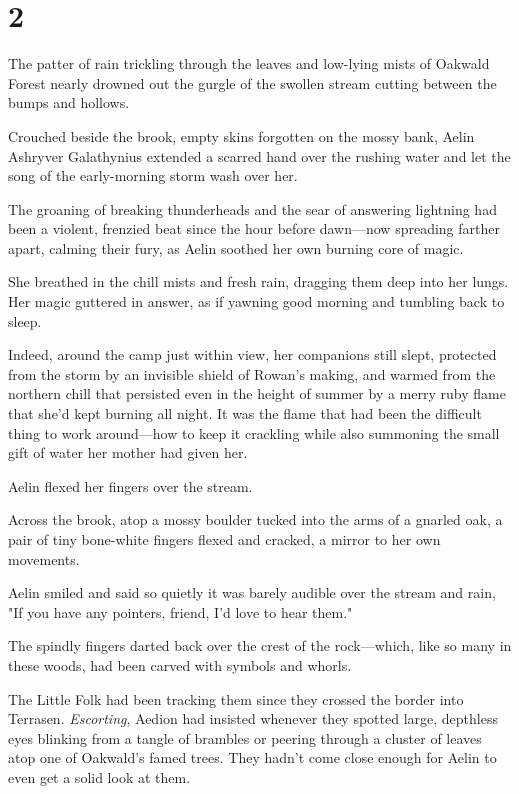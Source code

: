 
\chapter{2}

The patter of rain trickling through the leaves and low-lying mists of Oakwald Forest nearly drowned out the gurgle of the swollen stream cutting between the bumps and hollows.

Crouched beside the brook, empty skins forgotten on the mossy bank, Aelin Ashryver Galathynius extended a scarred hand over the rushing water and let the song of the early-morning storm wash over her.

The groaning of breaking thunderheads and the sear of answering lightning had been a violent, frenzied beat since the hour before dawn---now spreading farther apart, calming their fury, as Aelin soothed her own burning core of magic.

She breathed in the chill mists and fresh rain, dragging them deep into her lungs.
Her magic guttered in answer, as if yawning good morning and tumbling back to sleep.

Indeed, around the camp just within view, her companions still slept, protected from the storm by an invisible shield of Rowan's making, and warmed from the northern chill that persisted even in the height of summer by a merry ruby flame that she'd kept burning all night.
It was the flame that had been the difficult thing to work around---how to keep it crackling while also summoning the small gift of water her mother had given her.

Aelin flexed her fingers over the stream.

Across the brook, atop a mossy boulder tucked into the arms of a gnarled oak, a pair of tiny bone-white fingers flexed and cracked, a mirror to her own movements.

Aelin smiled and said so quietly it was barely audible over the stream and rain, "If you have any pointers, friend, I'd love to hear them."

The spindly fingers darted back over the crest of the rock---which, like so many in these woods, had been carved with symbols and whorls.

The Little Folk had been tracking them since they crossed the border into Terrasen.
\emph{Escorting}, Aedion had insisted whenever they spotted large, depthless eyes blinking from a tangle of brambles or peering through a cluster of leaves atop one of Oakwald's famed trees.
They hadn't come close enough for Aelin to even get a solid look at them.

